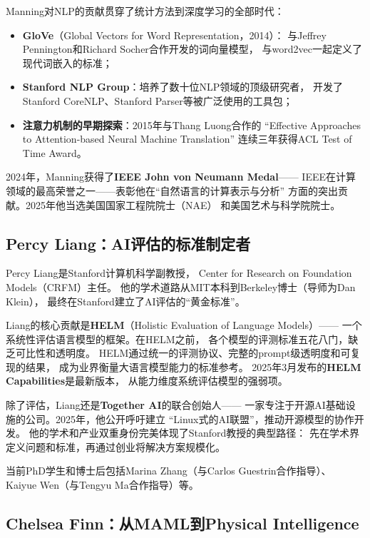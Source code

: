 Manning对NLP的贡献贯穿了统计方法到深度学习的全部时代：

\begin{itemize}[noitemsep]
  \item \textbf{GloVe}（Global Vectors for Word Representation，2014）：
        与Jeffrey Pennington和Richard Socher合作开发的词向量模型，
        与word2vec一起定义了现代词嵌入的标准；
  \item \textbf{Stanford NLP Group}：培养了数十位NLP领域的顶级研究者，
        开发了Stanford CoreNLP、Stanford Parser等被广泛使用的工具包；
  \item \textbf{注意力机制的早期探索}：2015年与Thang Luong合作的
        ``Effective Approaches to Attention-based Neural Machine Translation''
        连续三年获得ACL Test of Time Award。
\end{itemize}

2024年，Manning获得了\textbf{IEEE John von Neumann Medal}——
IEEE在计算领域的最高荣誉之一——表彰他在``自然语言的计算表示与分析''
方面的突出贡献。2025年他当选美国国家工程院院士（NAE）
和美国艺术与科学院院士。

\subsection{Percy Liang：AI评估的标准制定者}

Percy Liang是Stanford计算机科学副教授，
Center for Research on Foundation Models（CRFM）主任。
他的学术道路从MIT本科到Berkeley博士（导师为Dan Klein），
最终在Stanford建立了AI评估的``黄金标准''。

Liang的核心贡献是\textbf{HELM}（Holistic Evaluation of Language Models）——
一个系统性评估语言模型的框架。在HELM之前，
各个模型的评测标准五花八门，缺乏可比性和透明度。
HELM通过统一的评测协议、完整的prompt级透明度和可复现的结果，
成为业界衡量大语言模型能力的标准参考。
2025年3月发布的\textbf{HELM Capabilities}是最新版本，
从能力维度系统评估模型的强弱项。

除了评估，Liang还是\textbf{Together AI}的联合创始人——
一家专注于开源AI基础设施的公司。2025年，他公开呼吁建立
``Linux式的AI联盟''，推动开源模型的协作开发。
他的学术和产业双重身份完美体现了Stanford教授的典型路径：
先在学术界定义问题和标准，再通过创业将解决方案规模化。

当前PhD学生和博士后包括Marina Zhang（与Carlos Guestrin合作指导）、
Kaiyue Wen（与Tengyu Ma合作指导）等。

\subsection{Chelsea Finn：从MAML到Physical Intelligence}

